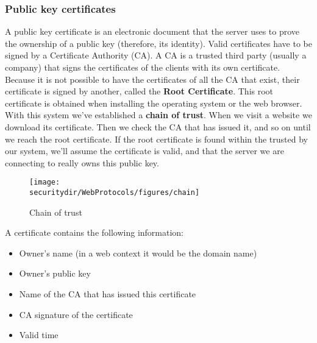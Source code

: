 \subsubsection{Public key certificates}
A public key certificate is an electronic document that the server uses to prove the ownership of a public key (therefore, its identity). Valid certificates have to be signed by a Certificate Authority (CA). A CA is a trusted third party (usually a company) that signs the certificates of the clients with its own certificate. Because it is not possible to have the certificates of all the CA that exist, their certificate is signed by another, called the \textbf{Root Certificate}. This root certificate is obtained when installing the operating system or the web browser. With this system we've established a \textbf{chain of trust}. When we visit a website we download its certificate. Then we check the CA that has issued it, and so on until we reach the root certificate. If the root certificate is found within the trusted by our system, we'll assume the certificate is valid, and that the server we are connecting to really owns this public key. 

\begin{figure}[htb]
	\begin{centering}
		\texttt{[image: \\securitydir/WebProtocols/figures/chain]}
		\par
	\end{centering}
	\caption{\label{fig:chain} Chain of trust}
\end{figure}

A certificate contains the following information:
\begin{itemize}
	\item Owner's name (in a web context it would be the domain name)
	\item Owner's public key
	\item Name of the CA that has issued this certificate
	\item CA signature of the certificate
	\item Valid time
\end{itemize}


